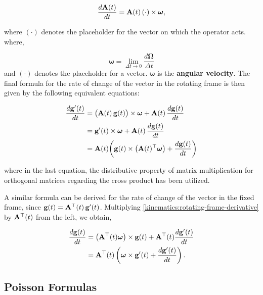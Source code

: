 \documentclass[12pt]{article}
\begin{document}
\[
  \frac{d\vb{A}(t)}{dt}
  =
  \vb{A}(t)\,(\cdot)\times\boldsymbol{\omega},
\]

where $(\cdot)$ denotes the placeholder for the vector on which the operator acts.
where,

\[
  \boldsymbol{\omega} = \lim_{\Delta t\to 0}\frac{d\boldsymbol{\Omega}}{\Delta t}
\]
and $(\cdot)$ denotes the placeholder for a vector. $\boldsymbol{\omega}$ is the
\textbf{angular velocity}. The final formula for the rate of change of the vector in the
rotating frame is then given by the following equivalent equations:

\begin{equation}
  \begin{aligned}
  \frac{d\vb{g}'(t)}{dt}
    &= \bigl(\vb{A}(t)\,\vb{g}(t)\bigr) \times \boldsymbol{\omega}
       + \vb{A}(t)\,\frac{d\vb{g}(t)}{dt} \nonumber \\
    &= \vb{g}'(t) \times \boldsymbol{\omega} + \vb{A}(t)\,\frac{d\vb{g}(t)}{dt} \nonumber \\
    &= \vb{A}(t)\!\left(\vb{g}(t) \times \bigl(\vb{A}(t)^\top\boldsymbol{\omega}\bigr)
       + \frac{d\vb{g}(t)}{dt}\right)
         \end{aligned}
  \label{kinematics:rotating-frame-derivative}
\end{equation}

where in the last equation, the distributive property of matrix multiplication for orthogonal
matrices regarding the cross product has been utilized.

A similar formula can be derived for the rate of change of the vector in the fixed frame,
since $\vb{g}(t) = \vb{A}^\top(t)\,\vb{g}'(t)$. Multiplying \eqref{kinematics:rotating-frame-derivative} by
$\vb{A}^\top(t)$ from the left, we obtain,

\begin{equation}
  \begin{aligned}
    \frac{d\vb{g}(t)}{dt}
      &= \bigl(\vb{A}^{\top}(t)\boldsymbol{\omega}\bigr)
         \times \vb{g}(t)
         + \vb{A}^{\top}(t)\frac{d\vb{g}'(t)}{dt} \\
      &= \vb{A}^{\top}(t)\left(
           \boldsymbol{\omega}\times\vb{g}'(t)
           + \frac{d\vb{g}'(t)}{dt}
         \right).
  \end{aligned}
  \label{kinematics:inertial-frame-derivative}
\end{equation}

\subsection{Poisson Formulas}
\end{document}
